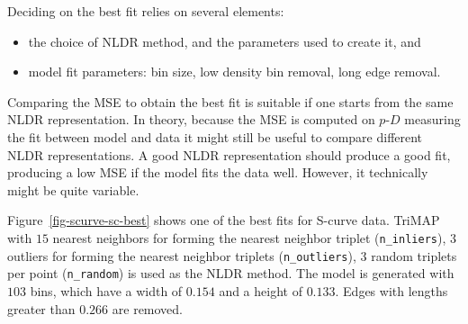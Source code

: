 \documentclass[
  12pt]{article}
\providecommand{\tightlist}{%
  \setlength{\itemsep}{0pt}\setlength{\parskip}{0pt}}\usepackage{longtable,booktabs,array}
\def\tightlist{}
\newcommand\pD{$p\text{-}D$}
\begin{document}
Deciding on the best fit relies on several elements:

\begin{itemize}
\tightlist
\item
  the choice of NLDR method, and the parameters used to create it, and
\item
  model fit parameters: bin size, low density bin removal, long edge
  removal.
\end{itemize}

Comparing the MSE to obtain the best fit is suitable if one starts from
the same NLDR representation. In theory, because the MSE is computed on
\pD{} measuring the fit between model and data it might still be useful
to compare different NLDR representations. A good NLDR representation
should produce a good fit, producing a low MSE if the model fits the
data well. However, it technically might be quite variable.

Figure~\ref{fig-scurve-sc-best} shows one of the best fits for S-curve
data. TriMAP with \(15\) nearest neighbors for forming the nearest
neighbor triplet (\texttt{n\_inliers}), \(3\) outliers for forming the
nearest neighbor triplets (\texttt{n\_outliers}), \(3\) random triplets
per point (\texttt{n\_random}) is used as the NLDR method. The model is
generated with \(103\) bins, which have a width of \(0.154\) and a
height of \(0.133\). Edges with lengths greater than \(0.266\) are
removed.
\end{document}
